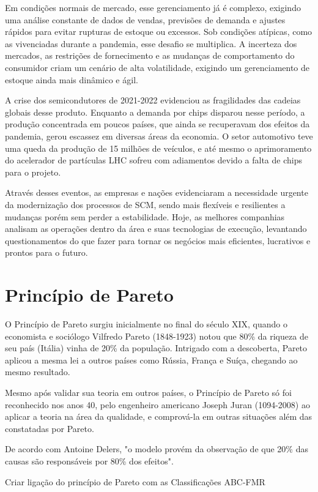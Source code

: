 Em condições normais de mercado, esse gerenciamento já é complexo, exigindo uma análise constante de dados de vendas, previsões de demanda e ajustes rápidos para evitar rupturas de estoque ou excessos. Sob condições atípicas, como as vivenciadas durante a pandemia, esse desafio se multiplica. A incerteza dos mercados, as restrições de fornecimento e as mudanças de comportamento do consumidor criam um cenário de alta volatilidade, exigindo um gerenciamento de estoque ainda mais dinâmico e ágil.

A crise dos semicondutores de 2021-2022 evidenciou as fragilidades das cadeias globais desse produto. Enquanto a demanda por chips disparou nesse período, a produção concentrada em poucos países, que ainda se recuperavam dos efeitos da pandemia, gerou escassez em diversas áreas da economia. O setor automotivo teve uma queda da produção de 15 milhões de veículos, e até mesmo o aprimoramento do acelerador de partículas LHC sofreu com adiamentos devido a falta de chips para o projeto. 

Através desses eventos, as empresas e nações evidenciaram a necessidade urgente da modernização dos processos de SCM, sendo mais flexíveis e resilientes a mudanças porém sem perder a estabilidade. Hoje, as melhores companhias analisam as operações dentro da área e suas tecnologias de execução, levantando questionamentos do que fazer para tornar os negócios mais eficientes, lucrativos e prontos para o futuro.

\section{Princípio de Pareto}

O Princípio de Pareto surgiu inicialmente no final do século XIX, quando o economista e sociólogo Vilfredo Pareto (1848-1923) notou que 80\% da riqueza de seu país (Itália) vinha de 20\% da população. Intrigado com a descoberta, Pareto aplicou a mesma lei a outros países como Rússia, França e Suíça, chegando ao mesmo resultado.

Mesmo após validar sua teoria em outros países, o Princípio de Pareto só foi reconhecido nos anos 40, pelo engenheiro americano Joseph Juran (1094-2008) ao aplicar a teoria na área da qualidade, e comprová-la em outras situações além das constatadas por Pareto.

De acordo com Antoine Delers, "o modelo provém da observação de que 20\% das causas são responsáveis por 80\% dos efeitos". 

Criar ligação do princípio de Pareto com as Classificações ABC-FMR

